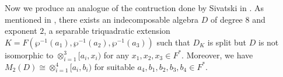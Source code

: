 \documentclass{amsart}
\newtheorem{lemma}[definition]{Lemma}
\numberwithin{equation}{section}
\newcommand{\im}{\operatorname{im}}
\newcommand{\qf}[1]{\langle #1\rangle}
\newcommand{\qpf}[1]{\langle\!\langle #1]\!]}
\newcommand{\trace}{\mathrm{Tr}}
\newcommand{\norm}{\mathrm{N}}
\newcommand{\W}{\mathsf{W}}
\newcommand{\D}{\mathsf{D}}
\begin{document}
%

Now we produce an analogue of the contruction done by Sivatski in \cite[Section 4]{Sivatski_CohoInv}. 
As mentioned in , there exists an indecomposable algebra $D$ of degree $8$ and exponent $2$, a separable triquadratic extension $K=F(\wp^{-1}(a_1), \wp^{-1}(a_2), \wp^{-1}(a_3))$ such that $D_K$ is split but $D$ is not isomorphic to $\otimes_{i = 1}^3 [a_i, x_i)$ for any $x_1, x_2, x_3 \in F^\ast$. 
Moreover, we have $M_2(D) \cong \otimes_{i = 1}^4 [a_i, b_i)$ for suitable $a_4, b_1,b_2, b_3, b_4\in F^\ast$.
\end{document}
